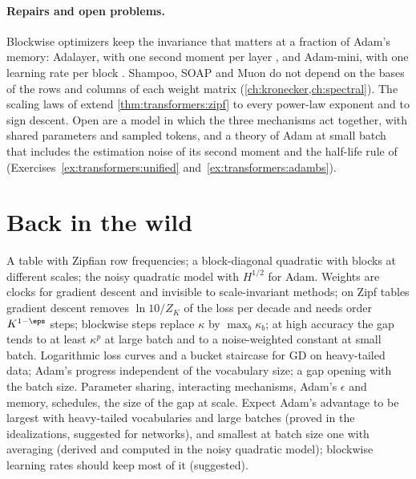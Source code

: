 \begin{refsection}
\paragraph{Repairs and open problems.} Blockwise optimizers keep the invariance that matters at a fraction of Adam's memory: Adalayer, with one second moment per layer \parencite{ZhaoEtAl2025}, and Adam-mini, with one learning rate per block \parencite{ZhangEtAl2025}. Shampoo, SOAP and Muon do not depend on the bases of the rows and columns of each weight matrix (\cref{ch:kronecker,ch:spectral}). The scaling laws of \textcite{KunstnerBach2025} extend \cref{thm:transformers:zipf} to every power-law exponent and to sign descent. Open are a model in which the three mechanisms act together, with shared parameters and sampled tokens, and a theory of Adam at small batch that includes the estimation noise of its second moment and the half-life rule of \textcite{MarekEtAl2025} (Exercises~\ref{ex:transformers:unified} and~\ref{ex:transformers:adambs}).

\section{Back in the wild}\label{sec:transformers:back}

{A table with Zipfian row frequencies; a block-diagonal quadratic with blocks at different scales; the noisy quadratic model with $H^{1/2}$ for Adam.}
{Weights are clocks for gradient descent and invisible to scale-invariant methods; on Zipf tables gradient descent removes $\ln10/Z_K$ of the loss per decade and needs order $K^{1-\eps}$ steps; blockwise steps replace $\kappa$ by $\max_b\kappa_b$; at high accuracy the gap tends to at least $\kappa^p$ at large batch and to a noise-weighted constant at small batch.}
{Logarithmic loss curves and a bucket staircase for GD on heavy-tailed data; Adam's progress independent of the vocabulary size; a gap opening with the batch size.}
{Parameter sharing, interacting mechanisms, Adam's $\epsilon$ and memory, schedules, the size of the gap at scale.}
{Expect Adam's advantage to be largest with heavy-tailed vocabularies and large batches (proved in the idealizations, suggested for networks), and smallest at batch size one with averaging (derived and computed in the noisy quadratic model); blockwise learning rates should keep most of it (suggested).}


\end{refsection}
